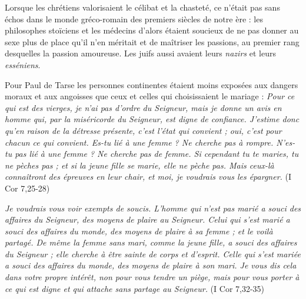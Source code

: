  Lorsque les chrétiens valorisaient le célibat et la chasteté, ce n'était pas sans échos dans le monde gréco-romain des premiers siècles de notre ère : les philosophes stoïciens et les médecins d'alors étaient soucieux de ne pas donner au sexe plus de place qu'il n'en méritait et de maîtriser les passions, au premier rang desquelles la passion amoureuse. Les juifs aussi avaient leurs \emph{nazirs} et leurs \emph{esséniens}. 

 Pour Paul de Tarse les personnes continentes étaient moins exposées aux dangers moraux et aux angoisses que ceux et celles qui choisissaient le mariage : \emph{Pour ce qui est des vierges, je n'ai pas d'ordre du Seigneur, mais je donne un avis en homme qui, par la miséricorde du Seigneur, est digne de confiance. J'estime donc qu'en raison de la détresse présente, c'est l'état qui convient ; oui, c'est pour chacun ce qui convient. Es-tu lié à une femme ? Ne cherche pas à rompre. N'es-tu pas lié à une femme ? Ne cherche pas de femme. Si cependant tu te maries, tu ne pèches pas ; et si la jeune fille se marie, elle ne pèche pas. Mais ceux-là connaîtront des épreuves en leur chair, et moi, je voudrais vous les épargner.} (I Cor 7,25-28)

 \emph{Je voudrais vous voir exempts de soucis. L'homme qui n'est pas marié a souci des affaires du Seigneur, des moyens de plaire au Seigneur. Celui qui s'est marié a souci des affaires du monde, des moyens de plaire à sa femme ; et le voilà partagé. De même la femme sans mari, comme la jeune fille, a souci des affaires du Seigneur ; elle cherche à être sainte de corps et d'esprit. Celle qui s'est mariée a souci des affaires du monde, des moyens de plaire à son mari. Je vous dis cela dans votre propre intérêt, non pour vous tendre un piège, mais pour vous porter à ce qui est digne et qui attache sans partage au Seigneur.} (I Cor 7,32-35)

